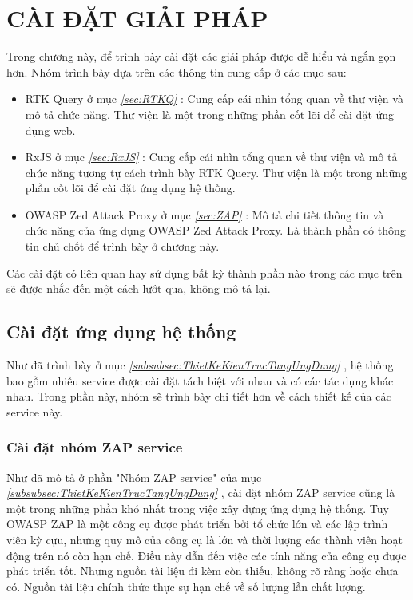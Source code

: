 \chapter{CÀI ĐẶT GIẢI PHÁP}

\tab Trong chương này, để trình bày cài đặt các giải pháp được dễ hiểu và ngắn gọn hơn.
Nhóm trình bày dựa trên các thông tin cung cấp ở các mục sau:

\begin{itemize}
  \item RTK Query ở mục \textit{\ref{sec:RTKQ} }: Cung cấp cái nhìn tổng quan về thư viện và mô tả chức năng.
        Thư viện là một trong những phần cốt lõi để cài đặt ứng dụng web.
  \item RxJS ở mục \textit{\ref{sec:RxJS} }: Cung cấp cái nhìn tổng quan về thư viện và mô tả chức năng tương tự cách trình bày RTK Query.
        Thư viện là một trong những phần cốt lõi để cài đặt ứng dụng hệ thống.
  \item OWASP Zed Attack Proxy ở mục \textit{\ref{sec:ZAP} }: Mô tả chi tiết thông tin và chức năng của ứng dụng OWASP Zed Attack Proxy.
        Là thành phần có thông tin chủ chốt để trình bày ở chương này.
\end{itemize}

Các cài đặt có liên quan hay sử dụng bất kỳ thành phần nào trong các mục trên sẽ được nhắc đến một cách lướt qua, không mô tả lại.

\section{Cài đặt ứng dụng hệ thống} \label{sec:CaiDatUngDungHeThong}

\tab Như đã trình bày ở mục \textit{\ref{subsubsec:ThietKeKienTrucTangUngDung} }, hệ thống bao gồm nhiều service được cài đặt tách biệt với nhau và có các tác dụng khác nhau.
Trong phần này, nhóm sẽ trình bày chi tiết hơn về cách thiết kế của các service này.

\subsection{Cài đặt nhóm ZAP service} \label{subsec:CaiDatNhomZapService}

\tab Như đã mô tả ở phần "Nhóm ZAP service" của mục \textit{\ref{subsubsec:ThietKeKienTrucTangUngDung} }, cài đặt nhóm ZAP service cũng là một trong những phần khó nhất trong việc xây dựng ứng dụng hệ thống.
Tuy OWASP ZAP là một công cụ được phát triển bởi tổ chức lớn và các lập trình viên kỳ cựu, nhưng quy mô của công cụ là lớn và thời lượng các thành viên hoạt động trên nó còn hạn chế.
Điều này dẫn đến việc các tính năng của công cụ được phát triển tốt.
Nhưng nguồn tài liệu đi kèm còn thiếu, không rõ ràng hoặc chưa có.
Nguồn tài liệu chính thức thực sự hạn chế về số lượng lẫn chất lượng.

